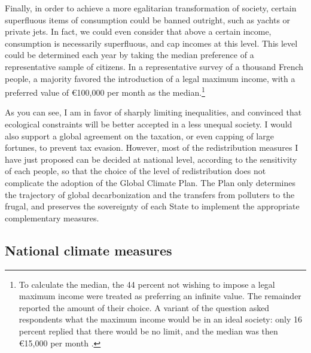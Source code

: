 \documentclass[a5paper,english,openany]{memoir}
\begin{document}
Finally, in order to achieve a more %
egalitarian transformation of society, certain superfluous items of consumption could be banned outright, such as yachts or private jets. In fact, we could even consider that above a certain income, consumption is necessarily superfluous, and cap incomes at this level. This level could be determined each year by taking the median preference of a representative sample of citizens. In a representative survey of a thousand French people, a majority favored %
the introduction of a legal maximum income, with a preferred value of \euro{}100,000 per month as the median.\footnote{To calculate the median, the 44 percent not wishing to impose a legal maximum income were treated as preferring an infinite value. The remainder reported the amount of their choice. A variant of the question asked respondents what the maximum income would be in an ideal society: only 16 percent replied that there would be no limit, and the median was then \euro{}15,000 per month \citep{fabre_determiner_2022}.} 

As you can see, I am in favor %
of sharply limiting inequalities, and convinced that ecological constraints will be better accepted in a less unequal society. I would also support %
a global agreement on the taxation, or even capping %
of large fortunes, to prevent tax evasion. However, most of the redistribution measures I have just proposed can be decided at national level, according to the sensitivity of each people, so that the choice of the level of redistribution does not complicate the adoption of the Global Climate Plan. The Plan only determines the  trajectory of global decarbonization  %
and the transfers from polluters to the frugal, and preserves the sovereignty of each State to implement the appropriate complementary measures.

\subsection*{National climate measures} %
\end{document}
